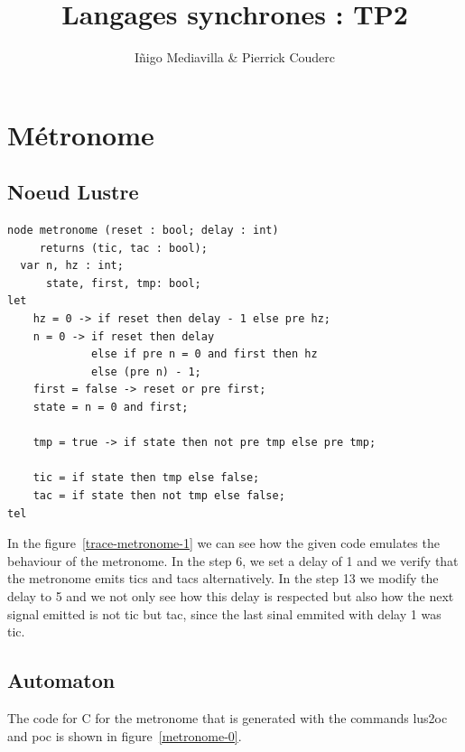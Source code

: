 \documentclass{article}
\title{Langages synchrones : TP2}
\author{I\~{n}igo Mediavilla \& Pierrick Couderc}
\begin{document}
\maketitle

\section{Métronome}

\subsection{Noeud Lustre}

\begin{verbatim}
node metronome (reset : bool; delay : int) 
     returns (tic, tac : bool);
  var n, hz : int;
      state, first, tmp: bool;
let
    hz = 0 -> if reset then delay - 1 else pre hz;
    n = 0 -> if reset then delay
             else if pre n = 0 and first then hz
             else (pre n) - 1;
    first = false -> reset or pre first;
    state = n = 0 and first;

    tmp = true -> if state then not pre tmp else pre tmp;
    
    tic = if state then tmp else false;
    tac = if state then not tmp else false;
tel
\end{verbatim}


In the figure~\ref{trace-metronome-1} we can see how the given code
emulates the behaviour of the metronome. In the step 6, we set a
delay of 1 and we verify that the metronome emits tics and tacs
alternatively. In the step 13 we modify the delay to 5 and we not
only see how this delay is respected but also how the next signal
emitted is not tic but tac, since the last sinal emmited with delay
1 was tic.

\subsection{Automaton}

The code for C for the metronome that is generated with the commands
lus2oc and poc is shown in figure~\ref{metronome-0}.
\end{document}
